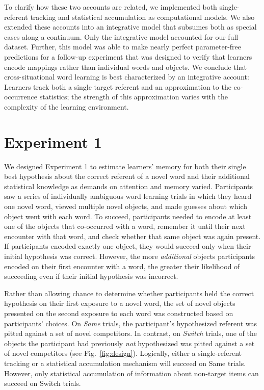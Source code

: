 \documentclass[man,floatsintext]{apa6}
\begin{document}
To clarify how these two accounts are related, we implemented both single-referent tracking and statistical accumulation as computational models. We also extended these accounts into an integrative model that subsumes both as special cases along a continuum. Only the integrative model accounted for our full dataset. Further, this model was able to make nearly perfect parameter-free predictions for a follow-up experiment that was designed to verify that learners encode mappings rather than individual words and objects. We conclude that cross-situational word learning is best characterized by an integrative account: Learners track both a single target referent and an approximation to the co-occurrence statistics; the strength of this approximation varies with the complexity of the learning environment.

\section{Experiment 1}

We designed Experiment 1 to estimate learners' memory for both their single best hypothesis about the correct referent of a novel word and their additional statistical knowledge as demands on attention and memory varied. Participants saw a series of individually ambiguous word learning trials in which they heard one novel word, viewed multiple novel objects, and made guesses about which object went with each word. To succeed, participants needed to encode at least one of the objects that co-occurred with a word, remember it until their next encounter with that word, and check whether that same object was again present. If participants encoded exactly one object, they would succeed only when their initial hypothesis was correct. However, the more \emph{additional} objects participants encoded on their first encounter with a word, the greater their likelihood of succeeding even if their initial hypothesis was incorrect. 

Rather than allowing chance to determine whether participants held the correct hypothesis on their first exposure to a novel word, the set of novel objects presented on the second exposure to each word was constructed based on participants' choices. On \emph{Same} trials, the participant's hypothesized referent was pitted against a set of novel competitors. In contrast, on \emph{Switch} trials, one of the objects the participant had previously \emph{not} hypothesized was pitted against a set of novel competitors (see Fig.~\ref{fig:design}). Logically, either a single-referent tracking or a statistical accumulation mechanism will succeed on Same trials. However, only statistical accumulation of information about non-target items can  succeed on Switch trials.
\end{document}
